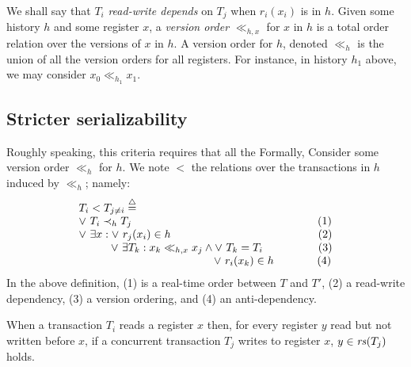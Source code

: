 We shall say that $T_i$ \emph{read-write depends} on $T_j$ when $r_i(x_i)$ is in $h$.
Given some history $h$ and some register $x$, a \emph{version order} $\ll_{h,x}$ for $x$ in $h$ is a total order relation over the versions of $x$ in $h$.
A version order for $h$, denoted $\ll_{h}$ is the union of all the version orders for all registers.
For instance, in history $h_1$ above,  we may consider $x_0 \ll_{h_1} x_1$.

\subsection{Stricter serializability}

Roughly speaking, this criteria requires that all the 
Formally,
Consider some version order $\ll_h$ for $h$.
We note $<$ the relations over the transactions in $h$ induced by $\ll_h$; namely:
\begin{displaymath}
  \begin{array}{l}
    T_i < T_{j \neq i}  \equaldef \\
    \lor~ T_i \hb_h T_j {\hspace{16.8em}\text{(1)}} \\
    \lor~ \exists x : \lor~ r_j(x_i) \in h {\hspace{13.3em}\text{(2)}} \\
    \hspace{2.9em}\lor~ \exists T_k : x_k \ll_{h,x} x_j \land \lor~T_k = T_i {\hspace{5em}\text{(3)}} \\
    \hspace{12.2em} \lor~ r_i(x_k) \in h {\hspace{3.9em}\text{(4)}}
  \end{array}
\end{displaymath}
In the above definition, (1) is a real-time order between $T$ and $T'$, (2) a read-write dependency, (3) a version ordering, and (4) an anti-dependency.

When a transaction $T_i$ reads a register $x$ then, for every register $y$ read but not written before $x$, if a concurrent transaction $T_j$ writes to register $x$, $y \in \readSetOf{T_j}$ holds.
